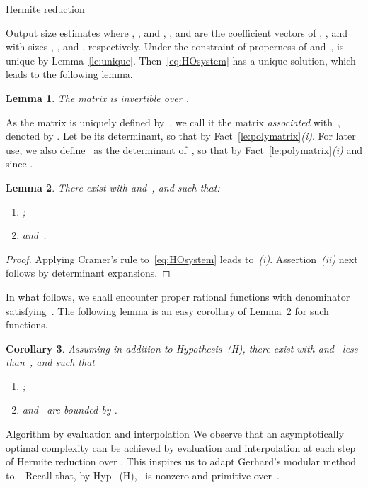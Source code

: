 \documentclass{sig-alt-full}
\newtheorem{lemma}{Lemma}
\newtheorem{cor}[lemma]{Corollary}
\begin{document}
\begin{section}{Hermite reduction}
\begin{subsection}{Output size estimates}
where , , and , , and
 are the coefficient vectors of , , and  with sizes
, , and , respectively.
Under the constraint of properness of  and~,  is
unique by Lemma~\ref{le:unique}.
Then~\eqref{eq:HOsystem} has a unique solution, which leads to
the following lemma.
\begin{lemma}\label{le:HOsystem}
The matrix  is invertible over .
\end{lemma}
As the matrix  is
uniquely defined by~, we call it the matrix \emph{associated\/}
with~, denoted by . Let  be its determinant, so
that  by
Fact~\ref{le:polymatrix}\emph{(i)}.
For later use, we also define ~as the determinant
of~, so that  by
Fact~\ref{le:polymatrix}\emph{(i)} and since .
\begin{lemma} \label{le:HRsize}
There exist  with
 and~, and such that:
\vspace{-0.15cm}
\begin{enumerate}
\item[(i)] ;
\vspace{-0.2cm}
\item[(ii)] 
and~.
\end{enumerate}
\end{lemma}
\begin{proof}
Applying Cramer's rule to~\eqref{eq:HOsystem}
leads to~\emph{(i)}.
Assertion~\emph{(ii)\/} next follows by determinant expansions.
\end{proof}

In what follows, we shall encounter proper rational functions
with denominator~ satisfying~.
The following lemma is an easy corollary of Lemma~\ref{le:HRsize} for
such functions.
\begin{cor} \label{cor:specialQ}
Assuming  in addition to Hypothesis~(H), there exist  with  and~ less than~, and
such that
\begin{enumerate}
\item[(i)] ;
\item[(ii)]  and~ are bounded
by .
\end{enumerate}
\end{cor}
\end{subsection}
\begin{subsection}{Algorithm by evaluation and interpolation}
We observe that an asymptotically optimal complexity can be achieved
by evaluation and interpolation at each step of Hermite reduction
over . This inspires us to adapt Gerhard's modular
method~\cite{Gerhard2001, Gerhard2004} to~.
Recall that, by Hyp.~(H), ~is nonzero and primitive over~.



\end{subsection}
\end{section}
\end{document}
